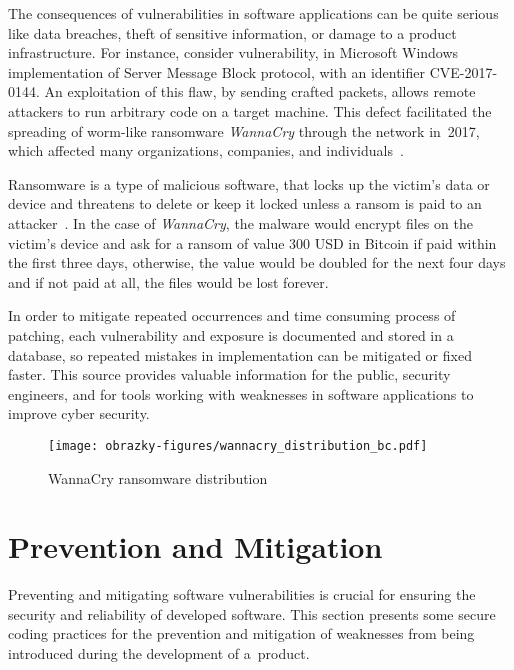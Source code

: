   The consequences of vulnerabilities in software applications can be quite serious like data breaches,
  theft of sensitive information, or damage to a product infrastructure. For instance, consider
  vulnerability, in Microsoft Windows implementation of Server Message Block protocol, with an identifier
  CVE-2017-0144. An exploitation of this flaw, by sending crafted packets, allows remote attackers to run
  arbitrary code on a target machine. This defect facilitated the spreading of worm-like ransomware
  \emph{WannaCry} through the network in~2017, which affected many organizations, companies,
  and individuals~\cite{WannaCry}.

  Ransomware is a type of malicious software, that locks up the victim's data or device and threatens to delete
  or keep it locked unless a ransom is paid to an attacker~\cite{Malware}. In the case of \emph{WannaCry},
  the malware would encrypt files on the victim's device and ask for a ransom of value 300 USD in Bitcoin
  if paid within the first three days, otherwise, the value would be doubled for the next four days and if
  not paid at all, the files would be lost forever.

  In order to mitigate repeated occurrences and time consuming process of patching, each
  vulnerability and exposure is documented and stored in a database, so repeated mistakes in implementation
  can be mitigated or fixed faster. This source provides valuable information for the public,
  security engineers, and for tools working with weaknesses in software applications to improve
  cyber security.

  \newpage

  \begin{figure}[h]
    \centering
    \texttt{[image: obrazky-figures/wannacry\_distribution\_bc.pdf]}
    \caption{WannaCry ransomware distribution}
  \end{figure}

  \section{Prevention and Mitigation}
  Preventing and mitigating software vulnerabilities is crucial for ensuring the security and reliability
  of developed software. This section presents some secure coding practices for the prevention
  and mitigation of weaknesses from being introduced during the development of a~product.

